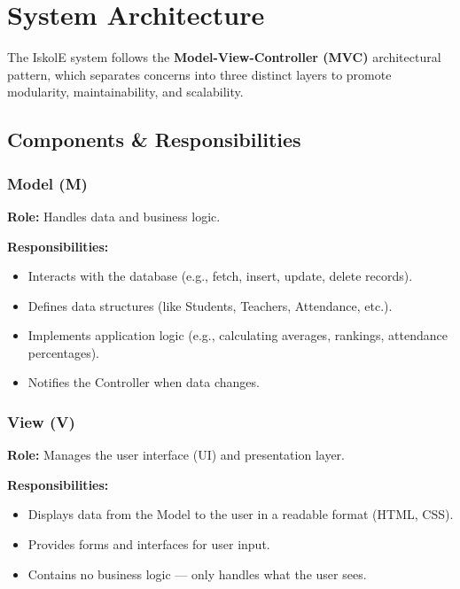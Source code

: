 \documentclass[12pt, a4paper]{report}
\begin{document}
\chapter{System Architecture}

The IskolE system follows the \textbf{Model-View-Controller (MVC)} architectural pattern, which separates concerns into three distinct layers to promote modularity, maintainability, and scalability.

\section{Components \& Responsibilities}

\subsection{Model (M)}

\textbf{Role:} Handles data and business logic.

\textbf{Responsibilities:}
\begin{itemize}
    \item Interacts with the database (e.g., fetch, insert, update, delete records).
    \item Defines data structures (like Students, Teachers, Attendance, etc.).
    \item Implements application logic (e.g., calculating averages, rankings, attendance percentages).
    \item Notifies the Controller when data changes.
\end{itemize}

\subsection{View (V)}

\textbf{Role:} Manages the user interface (UI) and presentation layer.

\textbf{Responsibilities:}
\begin{itemize}
    \item Displays data from the Model to the user in a readable format (HTML, CSS).
    \item Provides forms and interfaces for user input.
    \item Contains no business logic --- only handles what the user sees.
\end{itemize}
\end{document}
